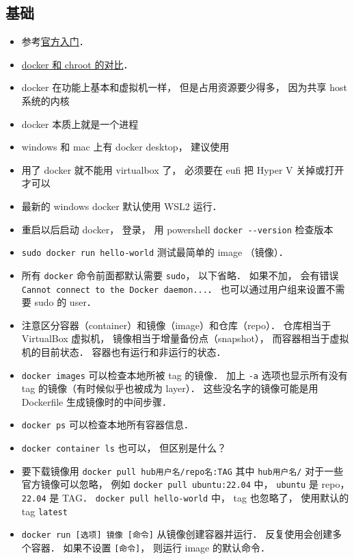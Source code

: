 \subsection{基础}
\begin{itemize}
\item 参考\href{https://docs.docker.com/get-started/}{官方入门}．
\item \href{https://devops.stackexchange.com/questions/2826/difference-between-chroot-and-docker}{docker 和 chroot 的对比}．
\item docker 在功能上基本和虚拟机一样， 但是占用资源要少得多， 因为共享 host 系统的内核
\item docker 本质上就是一个进程
\item windows 和 mac 上有 docker desktop， 建议使用
\item 用了 docker 就不能用 virtualbox 了， 必须要在 eufi 把 Hyper V 关掉或打开才可以
\item 最新的 windows docker 默认使用 WSL2 运行．
\item 重启以后启动 docker， 登录， 用 powershell \verb`docker --version` 检查版本
\item \verb`sudo docker run hello-world` 测试最简单的 image （镜像）．
\item 所有 \verb|docker| 命令前面都默认需要 \verb|sudo|， 以下省略． 如果不加， 会有错误 \verb|Cannot connect to the Docker daemon...|． 也可以通过用户组来设置不需要 sudo 的 user．
\item 注意区分容器（container）和镜像（image）和仓库（repo）． 仓库相当于 VirtualBox 虚拟机， 镜像相当于增量备份点（snapshot）， 而容器相当于虚拟机的目前状态． 容器也有运行和非运行的状态．
\item \verb`docker images` 可以检查本地所被 tag 的镜像． 加上 \verb|-a| 选项也显示所有没有 tag 的镜像（有时候似乎也被成为 layer）． 这些没名字的镜像可能是用 Dockerfile 生成镜像时的中间步骤．
\item \verb`docker ps` 可以检查本地所有容器信息．
\item \verb|docker container ls| 也可以， 但区别是什么？
\item 要下载镜像用 \verb`docker pull hub用户名/repo名:TAG` 其中 \verb|hub用户名/| 对于一些官方镜像可以忽略， 例如 \verb`docker pull ubuntu:22.04` 中， \verb|ubuntu| 是 repo， \verb|22.04| 是 TAG． \verb|docker pull hello-world| 中， tag 也忽略了， 使用默认的 tag \verb|latest|
\item \verb|docker run [选项] 镜像 [命令]| 从镜像创建容器并运行． 反复使用会创建多个容器． 如果不设置 \verb|[命令]|， 则运行 image 的默认命令．

\end{itemize}
